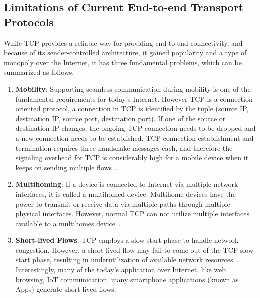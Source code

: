\subsection{Limitations of Current End-to-end Transport Protocols}
While TCP provides a reliable way for providing end to end connectivity, and because of its sender-controlled architecture, it gained popularity and a type of monopoly over the Internet, it has three fundamental problems, which can be summarized as follows.  
\begin{enumerate}
	\item  \textbf{Mobility}: Supporting seamless communication during mobility is one of the fundamental requirements for today's Internet. However TCP is a connection oriented protocol, a connection in TCP is identified by the tuple (source IP, destination IP, source port, destination port). If one of the source or destination IP changes, the ongoing TCP connection needs to be dropped and a new connection needs to be established. TCP connection establishment and termination requires three handshake messages each, and therefore the signaling overhead for TCP is considerably high for a mobile device when it keeps on sending multiple flows~\cite{Yadav2016}. 
	\item \textbf{Multihoming}: If a device is connected to Internet via multiple network interfaces, it is called a multihomed device. Multihome devices have the power to transmit or receive data via multiple paths through multiple physical interfaces. However, normal TCP can not utilize multiple interfaces available to a multihomes device~\cite{abdrabou2016experimental,de2016observing}. 
	\item \textbf{Short-lived Flows}: TCP employs a slow start phase to handle network congestion. However, a short-lived flow may fail to come out of the TCP slow start phase, resulting in underutilization of available network resources~\cite{de2016throughput,islam2016start}. Interestingly, many of the today's application over Internet, like web browsing, IoT communication, many smartphone applications (known as Apps) generate short lived flows. 
\end{enumerate}

